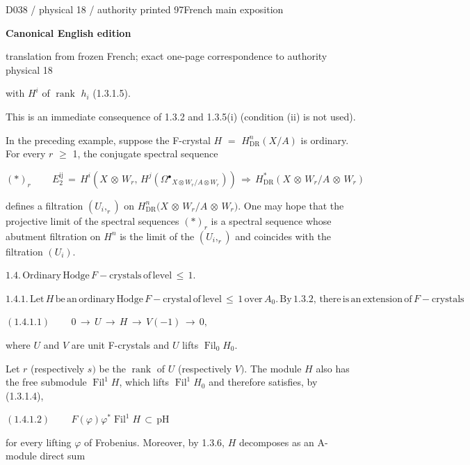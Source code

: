 \documentclass[9pt]{article}
\newcommand{\CanonText}[1]{\par{\fontsize{8.0}{9.35}\selectfont\RaggedRight #1\par}\vspace{2.2pt}}
\newcommand{\CanonDisplay}[1]{\par\vspace{1.2pt}\begin{center}{\fontsize{7.2}{8.4}\selectfont\(\displaystyle #1\)}\end{center}\vspace{1.2pt}}
\newcommand{\LayerTitle}{Canonical English edition}
\begin{document}
\noindent\begin{minipage}[t][\dimexpr\textheight-5pt\relax][t]{\textwidth}
{\sffamily\fontsize{7.3}{8.2}\selectfont\color{Quiet} D038 / physical 18 / authority printed 97\hfill French main exposition}
\par{}\vspace{4.5pt}
{\sffamily\fontsize{10.4}{11.6}\selectfont\bfseries\color{Accent} \LayerTitle}
\par{\sffamily\fontsize{6.7}{7.7}\selectfont\color{Quiet} translation from frozen French; exact one-page correspondence to authority physical 18}
\vspace{5pt}
\CanonText{with \(H^{i}\) of \(\operatorname{rank}\) \(h_{i}\) (1.3.1.5).}
\CanonText{This is an immediate consequence of 1.3.2 and 1.3.5(i) (condition (ii) is not used).}
\CanonText{In the preceding example, suppose the F-crystal \(H\) \(=\) \(H^{n}_{\mathrm{DR}}(X/A)\) is ordinary. For every \(r\) \(\geq{}\) 1, the conjugate spectral sequence}
\CanonDisplay{(*)_{r}\qquad\,E_{2}^{\mathrm{ij}}\,=\,H^{i}(X\,\otimes{}\,W_{r},\,H^{j}(\Omega{}^\bullet{}_{X\otimes{}W_{r}/A\otimes{}W_{r}}))\,\Rightarrow{}\,H^{*}_{\mathrm{DR}}(X\,\otimes{}\,W_{r}/A\,\otimes{}\,W_{r})}
\CanonText{defines a filtration \((U_{i},_{r})\) on \(H^{n}_{\mathrm{DR}}(X\) \(\otimes{}\) \(W_{r}/A\) \(\otimes{}\) \(W_{r})\). One may hope that the projective limit of the spectral sequences \((*)_{r}\) is a spectral sequence whose abutment filtration on \(H^{n}\) is the limit of the \((U_{i},_{r})\) and coincides with the filtration \((U_{i})\).}
\CanonDisplay{1.4.\,\text{Ordinary}\,\text{Hodge}\,F-\text{crystals}\,\text{of}\,\text{level}\,\leq{}\,1.}
\CanonDisplay{1.4.1.\,\text{Let}\,H\,\text{be}\,\text{an}\,\text{ordinary}\,\text{Hodge}\,F-\text{crystal}\,\text{of}\,\text{level}\,\leq{}\,1\,\text{over}\,A_{0}.\,\text{By}\,1.3.2,\,\text{there}\,\text{is}\,\text{an}\,\text{extension}\,\text{of}\,F-\text{crystals}}
\CanonDisplay{(1.4.1.1)\qquad\,0\,\to{}\,U\,\to{}\,H\,\to{}\,V(-1)\,\to{}\,0,}
\CanonText{where \(U\) and \(V\) are unit F-crystals and \(U\) lifts \(\operatorname{Fil}_{0}H_{0}\).}
\CanonText{Let \(r\) (respectively \(s)\) be the \(\operatorname{rank}\) of \(U\) (respectively \(V)\). The module \(H\) also has the free submodule \(\operatorname{Fil}^{1}H\), which lifts \(\operatorname{Fil}^{1}H_{0}\) and therefore satisfies, by (1.3.1.4),}
\CanonDisplay{(1.4.1.2)\qquad\,F(\varphi{})\varphi{}^{*}\operatorname{Fil}^{1}H\,\subset{}\,\text{pH}}
\CanonText{for every lifting \(\varphi{}\) of Frobenius. Moreover, by 1.3.6, \(H\) decomposes as an A-module direct sum}

\end{minipage}
\end{document}
